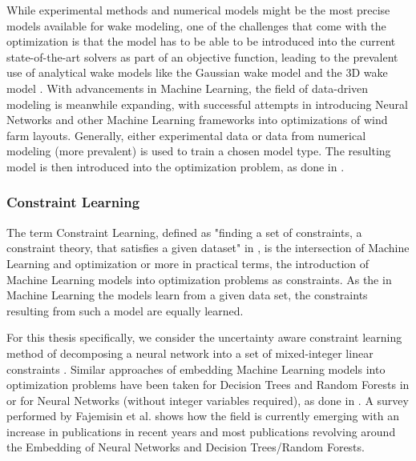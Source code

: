While experimental methods and numerical models might be the most precise models available for wake modeling, one of the challenges that come with the optimization is that the model has to be able to be introduced into the current state-of-the-art solvers as part of an objective function, leading to the prevalent use of analytical wake models like the Gaussian wake model and the 3D wake model  \cite{WANG2024118508}. With advancements in Machine Learning, the field of data-driven modeling is meanwhile expanding, with successful attempts in introducing Neural Networks and other Machine Learning frameworks into optimizations of wind farm layouts. Generally, either experimental data or data from numerical modeling (more prevalent) is used to train  a chosen model type. The resulting model is then introduced into the optimization problem, as done in \cite{YANG2023119240, wes-9-869-2024, TI2020114025, TI2021618}. 

\subsubsection{Constraint Learning}

The term Constraint Learning, defined as "finding a set of constraints, a constraint theory, that satisfies a given dataset" in \cite{de2018learning}, is the intersection of Machine Learning and optimization or more in practical terms, the introduction of Machine Learning models into optimization problems as constraints. As the in Machine Learning the models learn from a given data set, the constraints resulting from such a model are equally learned. \cite{de2018learning} 

For this thesis specifically, we consider the uncertainty aware constraint learning method of decomposing a neural network into a set of mixed-integer linear constraints  \cite{ALCANTARA2023120895, ALCANTARA2025127876}. Similar approaches of embedding Machine Learning models into optimization problems have been taken for Decision Trees and Random Forests in \cite{preprintBonfiettiEmbeddDecisionTrees} or for Neural Networks (without integer variables required), as done in \cite{dealba2024reformulationembeddingneuralnetwork}. A survey performed by Fajemisin et al. \cite{FAJEMISIN20241} shows how the field is currently emerging with an increase in publications in recent years and most publications revolving around the Embedding of Neural Networks and Decision Trees/Random Forests.
